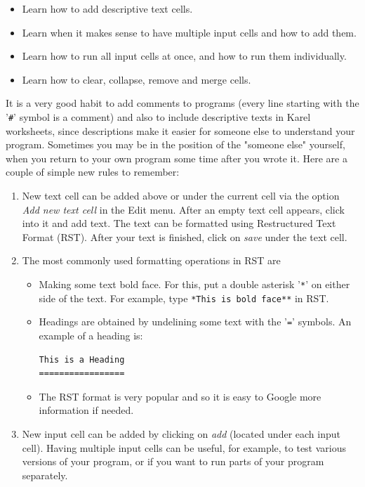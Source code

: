 {{{{\begin{itemize}
\item Learn how to add descriptive text cells.
\item Learn when it makes sense to have multiple input cells and how to add them.
\item Learn how to run all input cells at once, and how to run them individually.
\item Learn how to clear, collapse, remove and merge cells.
\end{itemize}
It is a very good habit to add comments to programs (every line starting with the '{\tt \#}'
symbol is a comment) and also to include descriptive 
texts in Karel worksheets, since descriptions make it easier for someone else to 
understand your program. Sometimes you may be in the position of the "someone else" yourself,
when you return to your own program some time after you wrote it. Here are a couple of 
simple new rules to remember:
\begin{enumerate} 
\item New text cell can be added above or under the current cell via the option 
      {\em Add new text cell} in the Edit menu. 
      After an empty text cell appears, click into it and add text. The text can be 
      formatted using Restructured Text Format (RST). After your text is finished, click 
      on {\em save} under the text cell. 
\item The most commonly used formatting operations in RST are 
      \begin{itemize}
      \item Making some text bold face. For this, put a double asterisk '{\tt **}' on either 
      side of the text. For example, type {\tt **This is bold face**} in RST.
      \item Headings are obtained by undelining some text with the '{\tt =}' symbols.
      An example of a heading is:
\begin{verbatim}
This is a Heading
=================
\end{verbatim}
      \item The RST format is very popular and so it is easy to Google more information
      if needed.
      \end{itemize}
\item New input cell can be added by clicking on {\em add} (located under each input cell). 
      Having multiple input cells can be useful, for example, to test various versions 
      of your program, or if you want to run parts of your program separately. 

\end{enumerate}}}}}
